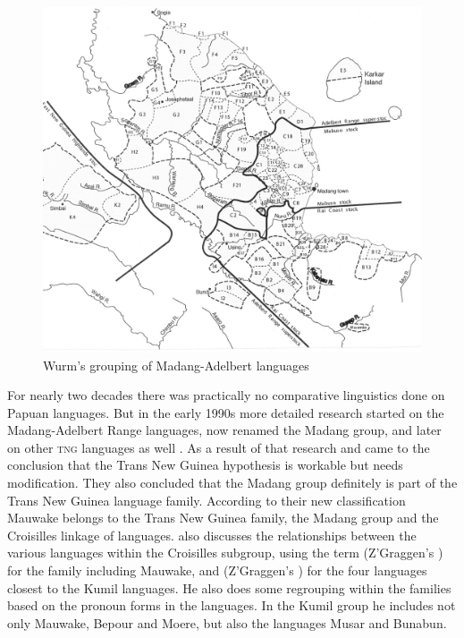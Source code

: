 \begin{figure}
\caption{Wurm's grouping of Madang-Adelbert languages \citep [Map~3]{Ross1996}}
\label{map:3:MadangWurm}
\includegraphics[width=\textwidth]{figures/1-wurms_grouping_of_madang_adelbert_languages.jpeg}
\end{figure}

For nearly two decades there was practically no comparative linguistics done on Papuan languages.  But in the early 1990s more detailed research started on the Madang-Adelbert Range languages, now renamed the Madang group, and later on other \textsc{tng} languages as well \citep{Pawley1998}. As a result of that research \citet{Pawley1995, Pawley2001} and \citet{Ross1995} came to the conclusion that the Trans New Guinea hypothesis is workable but needs modification. They also concluded that the Madang group definitely is part of the Trans New Guinea language family. According to their new classification Mauwake belongs to the Trans New Guinea family, the Madang group and the Croisilles linkage of languages. \citet[21--25]{Ross1996} also discusses the relationships between the various languages within the Croisilles subgroup, using the term  (Z'Graggen's   ) for the family including Mauwake, and  (Z'Graggen's  ) for the four languages closest to the Kumil languages. He also does some regrouping within the families based on the pronoun  forms in the languages.  In the Kumil group he includes not only Mauwake, Bepour and Moere, but also the languages Musar and Bunabun. 



